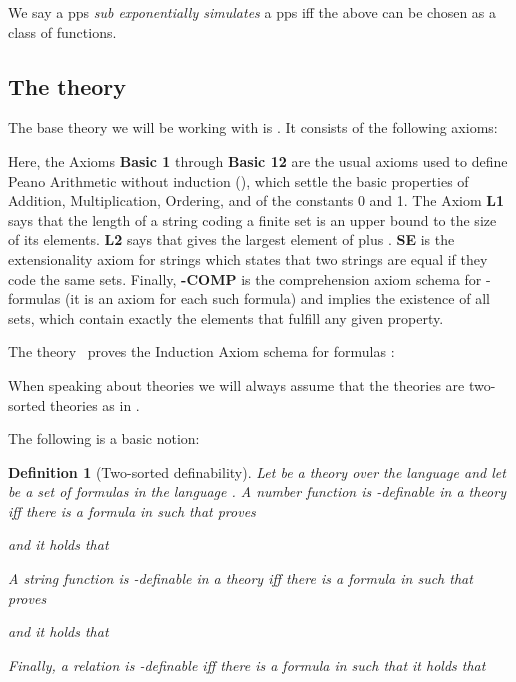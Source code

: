 \documentclass{LMCS}
\newtheorem{definition}{Definition}[section]
\begin{document}
\noindent We say a pps  {\em sub exponentially simulates} a pps  iff the above  can be chosen as a class of
 functions.

\subsection{The theory \VZ}\label{sec VZ}
The base theory we will be working with is . It consists of the following axioms:
\begin{center}
\framebox[\textwidth]{
\parbox{335pt}{


   }
  }
\end{center}
Here, the Axioms {\bf Basic 1} through {\bf Basic 12} are the usual axioms used to define Peano Arithmetic
without induction (), which settle the basic properties of Addition, Multiplication, Ordering,
and of the constants 0 and 1. The Axiom {\bf L1} says that the length of a string coding a finite set is an
upper bound to the size of its elements. {\bf L2} says that  gives the largest element of  plus . {\bf SE} is the extensionality axiom for strings which states that two strings are equal if they code the
same sets. Finally, {\bf -COMP} is the comprehension axiom schema for -formulas (it is
an axiom for each such formula) and implies the existence of all sets, which contain exactly the elements that
fulfill any given  property.

\begin{fact}
The theory \VZ\ proves the Induction Axiom schema for  formulas :

\end{fact}

When speaking about theories we will always assume that the theories are two-sorted theories as in \cite{CN10}.

The following is a basic notion:
\begin{definition}[Two-sorted definability]\label{def:Two-sorted definabilty}
Let  be a theory over the language  and let  be a set of
formulas in the language . A number function  is -definable in a theory  iff
there is a formula  in  such that  proves
  
  and it holds that

A string function  is -definable in a theory  iff there is a formula  in  such that  proves
  
  and it holds that
  
Finally, a relation  is -definable iff there is a formula  in  such that it holds that
  
\end{definition}
\end{document}

